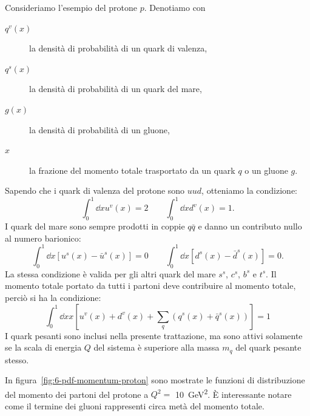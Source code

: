         Consideriamo l'esempio del protone $p$. Denotiamo con
        \begin{description}
            \item[$q^v(x)$] la densità di probabilità di un quark di valenza,

            \item[$q^s(x)$] la densità di probabilità di un quark del mare,

            \item[$g(x)$] la densità di probabilità di un gluone,

            \item[$x$] la frazione del momento totale trasportato da un quark $q$ o un gluone $g$.
        \end{description}
        Sapendo che i quark di valenza del protone sono $uud$, otteniamo la condizione:
        \begin{equation*}
            \int_{0}^{1}{\dd{x} u^v(x)} = 2 \qquad \int_{0}^{1}{\dd{x} d^v(x)} = 1.
        \end{equation*}
        I quark del mare sono sempre prodotti in coppie $q\bar{q}$ e danno un contributo nullo al numero barionico:
        \begin{equation*}
            \int_{0}^{1}{\dd{x} [u^s(x) - \bar{u}^s(x)]} = 0 \qquad \int_{0}^{1}{\dd{x} [d^s(x) - \bar{d}^s(x)]} = 0.
        \end{equation*}
        La stessa condizione è valida per gli altri quark del mare $s^s$, $c^s$, $b^s$ e $t^s$.
        Il momento totale portato da tutti i partoni deve contribuire al momento totale, perciò si ha la condizione:
        \begin{equation*}
            \int_{0}^{1}{\dd{x} x [u^{v}(x) + d^{v}(x) + \sum_{q} (q^{s}(x) + \bar{q}^{s}(x))]} = 1
        \end{equation*}
        I quark pesanti sono inclusi nella presente trattazione, ma sono attivi solamente se la scala di energia $Q$ del sistema è superiore alla massa $m_q$ del quark pesante stesso.

        In figura~\ref{fig:6-pdf-momentum-proton} sono mostrate le funzioni di distribuzione del momento dei partoni del protone a $Q^2 =$ \qty{10}{\giga \eV^2}. È interessante notare come il termine dei gluoni rappresenti circa metà del momento totale.

